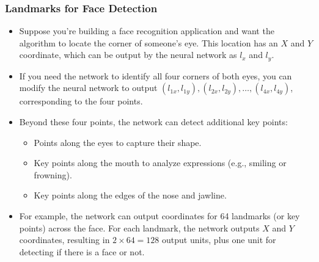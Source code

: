 \documentclass[letterpaper,12pt,notitlepage,twoside]{report}
\begin{document}
\subsubsection*{Landmarks for Face Detection}
\begin{itemize}
    \item Suppose you're building a face recognition application and want the algorithm to locate the corner of someone's eye. This location has an \(X\) and \(Y\) coordinate, which can be output by the neural network as \(l_x\) and \(l_y\).
    \item If you need the network to identify all four corners of both eyes, you can modify the neural network to output \((l_{1x}, l_{1y}), (l_{2x}, l_{2y}), \dots, (l_{4x}, l_{4y})\), corresponding to the four points.
    \item Beyond these four points, the network can detect additional key points:
    \begin{itemize}
        \item Points along the eyes to capture their shape.
        \item Key points along the mouth to analyze expressions (e.g., smiling or frowning).
        \item Key points along the edges of the nose and jawline.
    \end{itemize}
    \item For example, the network can output coordinates for 64 landmarks (or key points) across the face. For each landmark, the network outputs \(X\) and \(Y\) coordinates, resulting in \(2 \times 64 = 128\) output units, plus one unit for detecting if there is a face or not.
\end{itemize}
\end{document}
